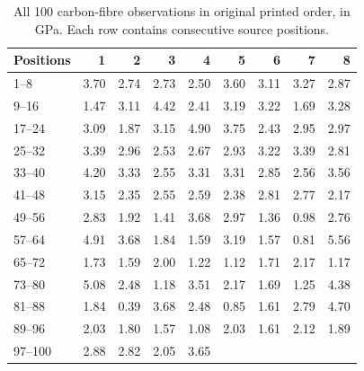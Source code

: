 \begin{table}[htbp]
\centering
\caption{All 100 carbon-fibre observations in original printed order, in GPa. Each row contains consecutive source positions.}\label{tab:carbon-complete}
\small
\begin{tabular}{lrrrrrrrr}
\toprule
Positions & 1 & 2 & 3 & 4 & 5 & 6 & 7 & 8 \\
\midrule
1--8 & 3.70 & 2.74 & 2.73 & 2.50 & 3.60 & 3.11 & 3.27 & 2.87 \\
9--16 & 1.47 & 3.11 & 4.42 & 2.41 & 3.19 & 3.22 & 1.69 & 3.28 \\
17--24 & 3.09 & 1.87 & 3.15 & 4.90 & 3.75 & 2.43 & 2.95 & 2.97 \\
25--32 & 3.39 & 2.96 & 2.53 & 2.67 & 2.93 & 3.22 & 3.39 & 2.81 \\
33--40 & 4.20 & 3.33 & 2.55 & 3.31 & 3.31 & 2.85 & 2.56 & 3.56 \\
41--48 & 3.15 & 2.35 & 2.55 & 2.59 & 2.38 & 2.81 & 2.77 & 2.17 \\
49--56 & 2.83 & 1.92 & 1.41 & 3.68 & 2.97 & 1.36 & 0.98 & 2.76 \\
57--64 & 4.91 & 3.68 & 1.84 & 1.59 & 3.19 & 1.57 & 0.81 & 5.56 \\
65--72 & 1.73 & 1.59 & 2.00 & 1.22 & 1.12 & 1.71 & 2.17 & 1.17 \\
73--80 & 5.08 & 2.48 & 1.18 & 3.51 & 2.17 & 1.69 & 1.25 & 4.38 \\
81--88 & 1.84 & 0.39 & 3.68 & 2.48 & 0.85 & 1.61 & 2.79 & 4.70 \\
89--96 & 2.03 & 1.80 & 1.57 & 1.08 & 2.03 & 1.61 & 2.12 & 1.89 \\
97--100 & 2.88 & 2.82 & 2.05 & 3.65 &  &  &  &  \\
\bottomrule
\end{tabular}
\end{table}
